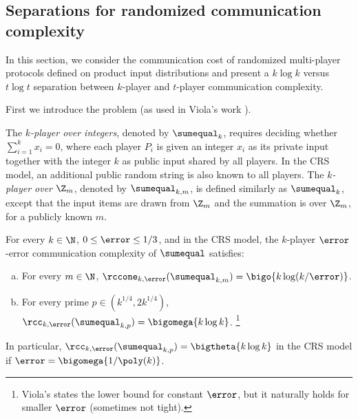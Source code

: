 \subsection{Separations for randomized communication complexity}

In this section, we consider the communication cost of randomized multi-player protocols defined on product input distributions and present a $k\log k$ versus $t\log t$ separation between $k$-player and $t$-player communication complexity.

First we introduce the \sumequal problem (as used in Viola's work \cite{Viola:2013we}).

\begin{definition}
The \emph{$k$-player \sumequal over integers}, denoted by $\sumequal_k$, 
requires deciding whether $\sum_{i =1 }^{k} x_i = 0$,
where each player $P_i$ is given an integer $x_i$ as its private input together with the integer $k$ as public input shared by all players.
In the CRS model, an additional public random string is also known to all players.
%
The \emph{$k$-player \sumequal over $\Z_m$}, denoted by $\sumequal_{k,m}$, 
is defined similarly 
as $\sumequal_{k}$,
except that the input items are drawn from $\Z_m$ and the summation is over $\Z_m$,
for a publicly known $m$.
\end{definition}

\begin{lemma}
\label{lemma:Viola}
For every $k\in\N$, $0\le \error\le 1/3$, 
and in the CRS model, 
the $k$-player $\error$-error communication complexity of $\sumequal$ satisfies:

\begin{enumerate}[(a)]
    
\item For every $m\in \N$, $\rccone_{k,\error}(\sumequal_{k,m}) = \bigo{k\log (k/\error)}$.

\item For every prime $p\in(k^{1/4},2k^{1/4})$, $\rcc_{k,\error}(\sumequal_{k,p}) = \bigomega{k\log k}$.%
\footnote{Viola's states the lower bound for constant $\error$, but it naturally holds for smaller $\error$ (sometimes not tight).}
\end{enumerate}

In particular, $\rcc_{k,\error}(\sumequal_{k,p})=\bigtheta{k\log k}$ in the CRS model if $\error=\bigomega{1/\poly(k)}$.
\end{lemma}

